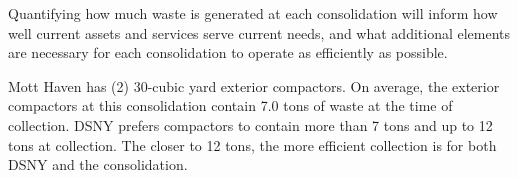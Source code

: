 
    Quantifying how much waste is generated at each consolidation will inform how well current assets and services serve current needs, and what additional elements are necessary for each consolidation to operate as efficiently as possible.
    
    Mott Haven has (2) 30-cubic yard exterior compactors. On average, the exterior compactors at this consolidation contain 7.0 tons of waste at the time of collection. DSNY prefers compactors to contain more than 7 tons and up to 12 tons at collection. The closer to 12 tons, the more efficient collection is for both DSNY and the consolidation.